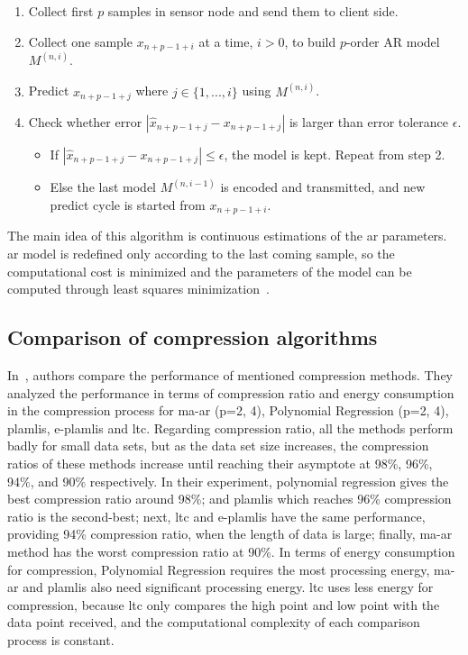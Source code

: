 \begin{enumerate}
    \item Collect first $p$ samples in sensor node and send them to client side.
    \item Collect one sample $x_{n+p-1+i}$ at a time, $i > 0$, to build
    $p$-order
    AR model $M^{(n, i)}$.
    \item Predict $x_{n+p-1+j}$ where $j \in \{1, ..., i\}$ using $M^{(n, i)}$.
    \item Check whether error $ |\hat{x}_{n+p-1+j} - x_{n+p-1+j}|$ is larger
    than error tolerance $\epsilon$.
        \begin{itemize}
            \item If $|\hat{x}_{n+p-1+j} - x_{n+p-1+j}| \leqslant \epsilon$, the
            model is kept. Repeat from step 2.
            \item Else the last model $M^{(n, i-1)}$ is encoded and transmitted,
            and new predict cycle is started from $x_{n+p-1+i}$.
        \end{itemize}
\end{enumerate}
The main idea of this algorithm is continuous estimations of the \acrshort{ar}
parameters. \acrshort{ar} model is redefined only according to the last coming
sample, so the computational cost is minimized and the parameters of the model
can be computed through least squares minimization~\cite{zordan2012compress}.

\subsection{Comparison of compression algorithms}
\label{sec:comparision-lossy}
In~\cite{zordan2014performance}, authors compare the performance of mentioned
compression methods. They analyzed the performance in terms of compression ratio
and energy consumption in the compression process for \acrshort{ma-ar} (p={2,
4}), Polynomial Regression (p={2, 4}), \acrshort{plamlis}, \acrshort{e-plamlis}
and \acrshort{ltc}. Regarding compression ratio, all the methods perform badly
for small data sets, but as the data set size increases, the compression ratios
of these methods increase until reaching their asymptote at 98\%, 96\%, 94\%,
and 90\% respectively.
In their experiment, polynomial regression gives the best compression ratio
around 98\%; and \acrshort{plamlis} which reaches 96\% compression ratio is the
second-best; next, \acrshort{ltc} and \acrshort{e-plamlis} have the same
performance, providing 94\% compression ratio, when the length of data is large;
finally, \acrshort{ma-ar} method has the worst compression ratio at 90\%. In
terms of energy consumption for compression, Polynomial Regression requires the
most processing energy, \acrshort{ma-ar} and \acrshort{plamlis} also need
significant processing energy. \acrshort{ltc} uses less energy for compression,
because \acrshort{ltc} only compares the high point and low point with the data
point received, and the computational complexity of each comparison process is
constant.
